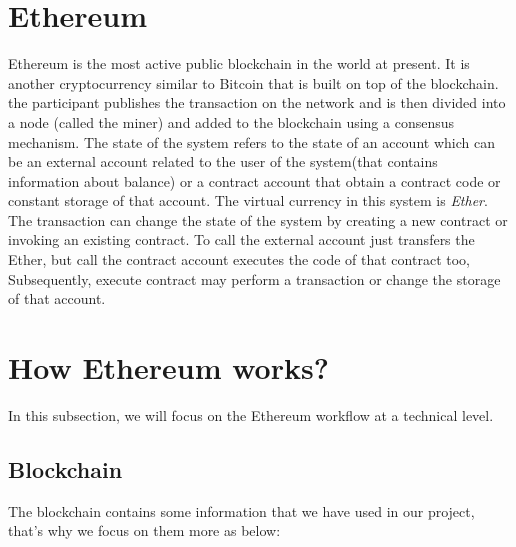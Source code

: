  \section{Ethereum}
 Ethereum is the most active public blockchain in the world at present. It is another cryptocurrency similar to Bitcoin that is built on top of the blockchain. the participant publishes the transaction on the network and is then divided into a node (called the miner) and added to the blockchain using a consensus mechanism. The state of the system refers to the state of an account which can be an external account related to the user of the system(that contains information about balance) or a contract account that obtain a contract code or constant storage of that account. The virtual currency in this system is \textit{Ether}. The transaction can change the state of the system by creating a new contract or invoking an existing contract. To call the external account just transfers the Ether, but call the contract account executes the code of that contract too, Subsequently, execute contract may perform a transaction or change the storage of that account\cite{Ilya}.

\section{How Ethereum works?}
In this subsection, we will focus on the Ethereum workflow at a technical level.
\subsection{Blockchain}
The blockchain contains some information that we have used in our project, that's why we focus on them more as below:

